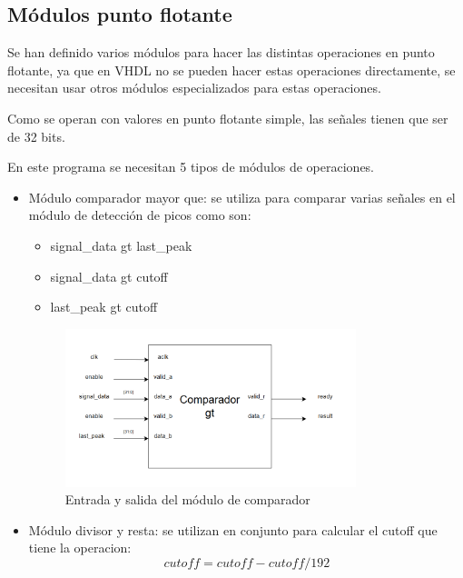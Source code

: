 \subsection{Módulos punto flotante}

Se han definido varios módulos para hacer las distintas operaciones en punto flotante, ya que en VHDL no se
pueden hacer estas operaciones directamente, se necesitan usar otros módulos especializados para estas operaciones.

Como se operan con valores en punto flotante simple, las señales tienen que ser de 32 bits.

En este programa se necesitan 5 tipos de módulos de operaciones.

\begin{itemize}
    \item Módulo comparador mayor que: se utiliza para comparar varias señales en el módulo de detección de picos como son:
    \begin{itemize}
        \item signal\_data gt last\_peak
        \item signal\_data gt cutoff
        \item last\_peak gt cutoff
    \end{itemize}

    \begin{figure}[h!]
        \centering
        \includegraphics[width=0.8\textwidth]{./Images/img_implementacion_hw/comparadorgt.png}
        \caption{Entrada y salida del módulo de comparador}
        \label{fig:comparadorgt}
    \end{figure}

    \item Módulo divisor y resta: se utilizan en conjunto para calcular el cutoff que tiene la operacion:
    \[cutoff = cutoff - cutoff/192\]


\end{itemize}
